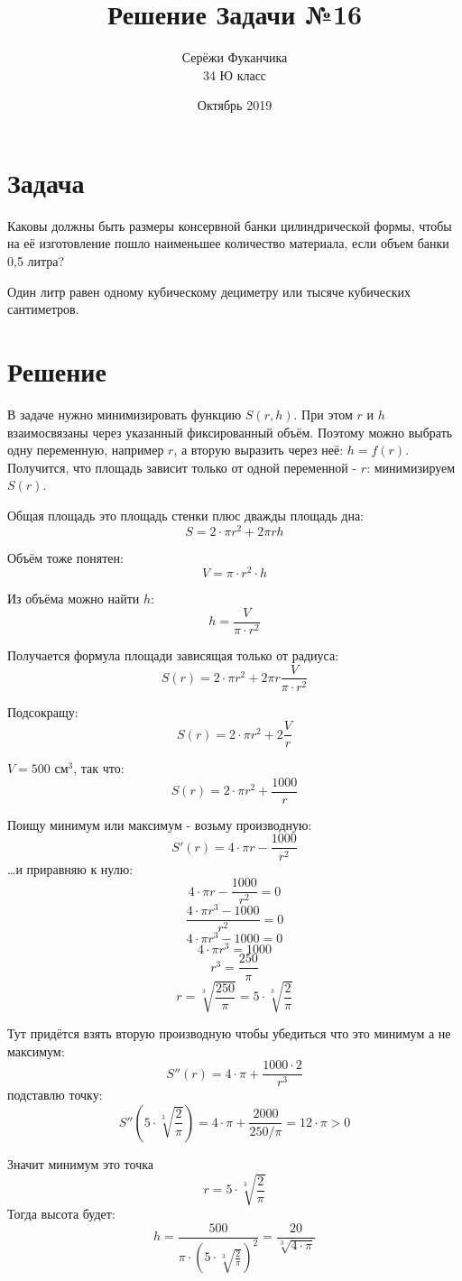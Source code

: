 \documentclass{article}
\title{Решение Задачи №16}
\author{Серёжи Фуканчика\\34 Ю класс}
\date{Октябрь 2019}
\begin{document}
\maketitle

\section{Задача}
Каковы должны быть размеры консервной банки цилиндрической формы, чтобы на её
изготовление пошло наименьшее количество материала, если объем банки 0,5 литра?

Один литр равен одному кубическому дециметру или тысяче кубических сантиметров.

\section{Решение}
В задаче нужно минимизировать функцию $S(r,h)$. При этом $r$ и $h$ взаимосвязаны
через указанный фиксированный объём. Поэтому можно выбрать одну переменную,
например $r$, а вторую выразить через неё: $h=f(r)$. Получится, что площадь
зависит только от одной переменной - $r$: минимизируем $S(r)$.

Общая площадь это площадь стенки плюс дважды площадь дна:
$$S=2\cdot\pi{}r^2+2\pi{}r{}h$$

Объём тоже понятен:
$$V=\pi\cdot{}r^2\cdot{}h$$

Из объёма можно найти $h$:
$$h=\frac{V}{\pi\cdot{}r^2}$$

Получается формула площади зависящая только от радиуса:
$$S(r)=2\cdot\pi{}r^2+2\pi{}r{}\frac{V}{\pi\cdot{}r^2}$$

Подсокращу:
$$S(r)=2\cdot\pi{}r^2+2\frac{V}{r}$$

$V=500\textrm{ см}^3$, так что:
$$S(r)=2\cdot\pi{}r^2+\frac{1000}{r}$$

Поищу минимум или максимум - возьму производную:
$$S'(r)=4\cdot\pi{}r-\frac{1000}{r^2}$$
\ldots{}и приравняю к нулю:
$$4\cdot\pi{}r-\frac{1000}{r^2}=0$$
$$\frac{4\cdot\pi{}r^3-1000}{r^2}=0$$
$$4\cdot\pi{}r^3-1000=0$$
$$4\cdot\pi{}r^3=1000$$
$$r^3=\frac{250}{\pi}$$
$$r=\sqrt[3]{\frac{250}{\pi}}=5\cdot{}\sqrt[3]{\frac{2}{\pi}}$$

Тут придётся взять вторую производную чтобы убедиться что это минимум а не
максимум:
$$S''(r)=4\cdot\pi+\frac{1000\cdot{}2}{r^3}$$
подставлю точку:
$$S''(5\cdot{}\sqrt[3]{\frac{2}{\pi}})=4\cdot\pi+\frac{2000}{250/\pi}=12\cdot\pi>0$$

Значит минимум это точка
$$r=5\cdot{}\sqrt[3]{\frac{2}{\pi}}$$
Тогда высота будет:
$$h=\frac{500}{\pi\cdot{}\left(5\cdot{}\sqrt[3]{\frac{2}{\pi}}\right)^2}=\frac{20}{\sqrt[3]{4\cdot\pi}}$$
\end{document}
